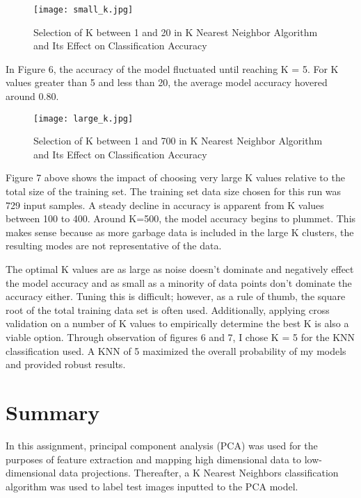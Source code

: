 \documentclass[12pt]{article}
\begin{document}
\begin{figure}[!htb]
    \centering
    \texttt{[image: small\_k.jpg]}
  \caption{Selection of K between 1 and 20 in K Nearest Neighbor Algorithm and Its Effect on Classification Accuracy}
\end{figure}
\FloatBarrier

\noindent
In Figure 6, the accuracy of the model fluctuated until reaching K = 5. For K values greater than 5 and less than 20, the average model accuracy hovered around 0.80. 

\begin{figure}[!htb]
    \centering
    \texttt{[image: large\_k.jpg]}
  \caption{Selection of K between 1 and 700 in K Nearest Neighbor Algorithm and Its Effect on Classification Accuracy}
\end{figure}
\FloatBarrier

\noindent
Figure 7 above shows the impact of choosing very large K values relative to the total size of the training set. The training set data size chosen for this run was 729 input samples. A steady decline in accuracy is apparent from K values between 100 to 400. Around K=500, the model accuracy begins to plummet. This makes sense because as more garbage data is included in the large K clusters, the resulting modes are not representative of the data.

\bigbreak
\noindent
The optimal K values are as large as noise doesn't dominate and negatively effect the model accuracy and as small as a minority of data points don't dominate the accuracy either. Tuning this is difficult; however, as a rule of thumb, the square root of the total training data set is often used. Additionally, applying cross validation on a number of K values to empirically determine the best K is also a viable option. Through observation of figures 6 and 7, I chose K = 5 for the KNN classification used. A KNN of 5 maximized the overall probability of my models and provided robust results.

\section{Summary}

In this assignment, principal component analysis (PCA) was used for the purposes of feature extraction and mapping high dimensional data to low-dimensional data projections. Thereafter, a K Nearest Neighbors classification algorithm was used to label test images inputted to the PCA model. 
\end{document}
